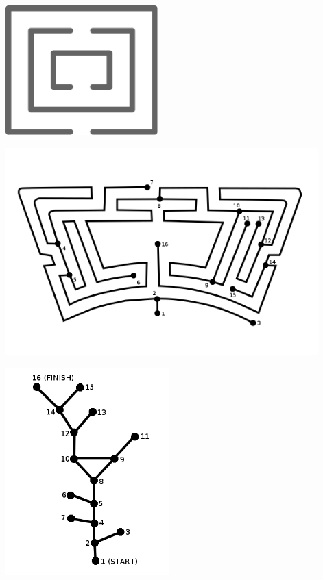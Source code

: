 \documentclass{beamer} %
\begin{document}
\begin{frame}
  \centering
  \includegraphics[height=50mm]{assets/maze.pdf}
\end{frame}

\begin{frame}
  \centering
  \includegraphics[height=80mm]{assets/hampton2.png}
\end{frame}

\begin{frame}
  \centering
  \includegraphics[height=80mm]{assets/hampton3.png}
\end{frame}
\end{document}
